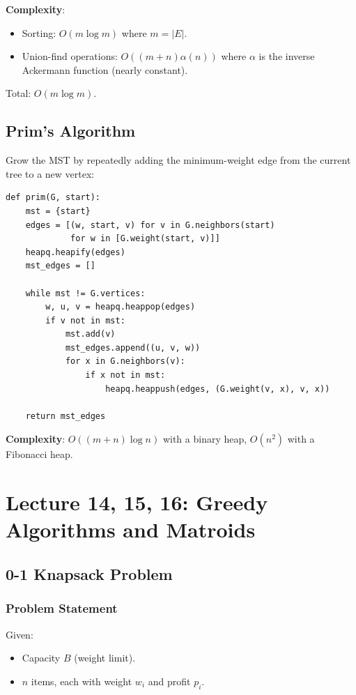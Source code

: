 \documentclass[11pt]{article}
\begin{document}
{{{\textbf{Complexity}:
\begin{itemize}
\item Sorting: $O(m \log m)$ where $m = |E|$.
\item Union-find operations: $O((m + n) \alpha(n))$ where $\alpha$ is the inverse Ackermann function (nearly constant).
\end{itemize}

Total: $O(m \log m)$.

\subsection*{Prim's Algorithm}

Grow the MST by repeatedly adding the minimum-weight edge from the current tree to a new vertex:

\begin{lstlisting}
def prim(G, start):
    mst = {start}
    edges = [(w, start, v) for v in G.neighbors(start) 
             for w in [G.weight(start, v)]]
    heapq.heapify(edges)
    mst_edges = []
    
    while mst != G.vertices:
        w, u, v = heapq.heappop(edges)
        if v not in mst:
            mst.add(v)
            mst_edges.append((u, v, w))
            for x in G.neighbors(v):
                if x not in mst:
                    heapq.heappush(edges, (G.weight(v, x), v, x))
    
    return mst_edges
\end{lstlisting}

\textbf{Complexity}: $O((m + n) \log n)$ with a binary heap, $O(n^2)$ with a Fibonacci heap.

\section{Lecture 14, 15, 16: Greedy Algorithms and Matroids}

\subsection*{0-1 Knapsack Problem}

\subsubsection*{Problem Statement}
Given:
\begin{itemize}
\item Capacity $B$ (weight limit).
\item $n$ items, each with weight $w_i$ and profit $p_i$.
\end{itemize}

}}}
\end{document}
